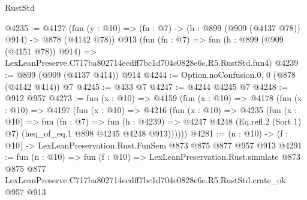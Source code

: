 \begin{lexlean}{RustStd}
\begin{coremodule}
@4235 := @4127
    (fun (y : @10) => (fn : @7) -> (h : @899 (@909 (@4137 @78)) @914) -> @878 (@4142 @78))
    @913
    (fun (fn : @7) =>
    fun (h : @899 (@909 (@4151 @78)) @914) =>
    LexLeanPreserve.C717ba802714ecdff7bc1d704c0828e6c.R5.RustStd.fun4)
@4239 := @899 (@909 (@4137 @414)) @914
@4244 := Option.noConfusion.{0, 0} (@878 (@4142 @414)) @7
@4245 := @433 @7
@4247 := @4244 @4245 @7
@4248 := @912 @957
@4273 := fun (x : @10) =>
  @4159
    (fun (x : @10) =>
    @4178
      (fun (x : @10) =>
      @4197
        (fun (x : @10) =>
        @4216
          (fun (x : @10) =>
          @4235
            (fun (x : @10) =>
            fun (fn : @7) =>
            fun (h : @4239) =>
            @4247 @4248 (Eq.refl.{2} (Sort 1) @7) (heq_of_eq.{1} @898 @4245 @4248 @913))))))
@4281 := (n : @10) -> (f : @10) -> LexLeanPreservation.Rust.FunSem @873 @875 @877 @957 @913
@4291 := fun (n : @10) =>
  fun (f : @10) =>
  LexLeanPreservation.Rust.simulate
    @873
    @875
    @877
    LexLeanPreserve.C717ba802714ecdff7bc1d704c0828e6c.R5.RustStd.crate_ok
    @957
    @913
\end{coremodule}
\end{lexlean}
